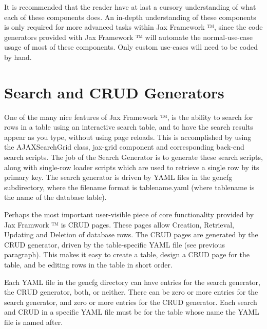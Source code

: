 \documentclass[letterpaper,10pt,english]{sphinxmanual}
\begin{document}
It is recommended that the reader have at last a cursory understanding of what each of these components
does.  An in-depth understanding of these components is only required for more advanced tasks within
Jax Framework ™, since the code generators provided with Jax Framework ™ will automate
the normal-use-case usage of most of these components.  Only custom use-cases will need to be coded
by hand.


\section{Search and CRUD Generators}
\label{jaxFrameworkGuide:search-and-crud-generators}
One of the many nice features of Jax Framework ™, is the ability to search for rows in a table
using an interactive search table, and to have the search results appear as you type, without using
page reloads.  This is accomplished by using the AJAXSearchGrid class, jax-grid component and
corresponding back-end search scripts.  The job of the Search Generator is to generate these search
scripts, along with single-row loader scripts which are used to retrieve a single row by its primary
key.  The search generator is driven by YAML files in the gencfg subdirectory, where the filename
format is tablename.yaml (where tablename is the name of the database table).

Perhaps the most important user-visible piece of core functionality provided by Jax Framwork ™
is CRUD pages.  These pages allow Creation, Retrieval, Updating and Deletion of database rows.  The
CRUD pages are generated by the CRUD generator, driven by the table-specific YAML file (see previous
paragraph).  This makes it easy to create a table, design a CRUD page for the table, and be editing
rows in the table in short order.

Each YAML file in the gencfg directory can have entries for the search generator, the CRUD
generator, both, or neither.  There can be zero or more entries for the search generator, and zero
or more entries for the CRUD generator.  Each search and CRUD in a specific YAML file must be for
the table whose name the YAML file is named after.
\end{document}

